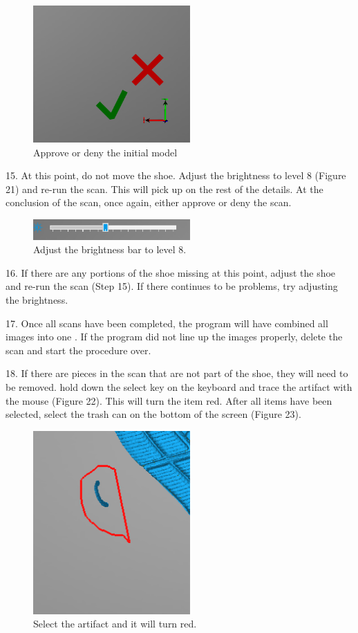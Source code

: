 \begin{figure}[!htp]
\centering
\includegraphics[width=6cm]{YesNo}
\caption{Approve or deny the initial model}
\label{Image 20}
\end{figure}

15. At this point, do not move the shoe. Adjust the brightness to level 8 (Figure 21) and re-run the scan. This will pick up on the rest of the details. At the conclusion of the scan, once again, either approve or deny the scan.

\begin{figure}[!htp]
\centering
\includegraphics[width=6cm]{Brightness_Bar_8}
\caption{Adjust the brightness bar to level 8.}
\label{Image 21}
\end{figure}

16. If there are any portions of the shoe missing at this point, adjust the shoe and re-run the scan (Step 15). If there continues to be problems, try adjusting the brightness. 

17. Once all scans have been completed, the program will have combined all images into one . If the program did not line up the images properly, delete the scan and start the procedure over. 

18. If there are pieces in the scan that are not part of the shoe, they will need to be removed. hold down the select key on the keyboard and trace the artifact with the mouse (Figure 22). This will turn the item red. After all items have been selected, select the trash can on the bottom of the screen (Figure 23). 

\begin{figure}[!htp]
\centering
\includegraphics[width=6cm]{Mark}
\caption{Select the artifact and it will turn red.}
\label{Image 22}
\end{figure}

